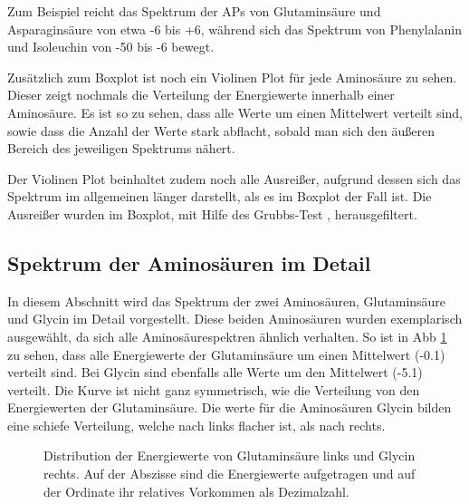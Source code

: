 Zum Beispiel reicht das Spektrum der \ac{APs} von Glutaminsäure und Asparaginsäure von etwa -6 bis +6, während sich das Spektrum von Phenylalanin und Isoleuchin von -50 bis -6 bewegt. 

Zusätzlich zum Boxplot ist noch ein Violinen Plot für jede Aminosäure zu sehen. Dieser zeigt nochmals die Verteilung der Energiewerte innerhalb einer Aminosäure. Es ist so zu sehen, dass alle Werte um einen Mittelwert verteilt sind, sowie dass die Anzahl der Werte stark abflacht, sobald man sich den äußeren Bereich des jeweiligen Spektrums nähert.

Der Violinen Plot beinhaltet zudem noch alle Ausreißer, aufgrund dessen sich das Spektrum im allgemeinen länger darstellt, als es im Boxplot der Fall ist. Die Ausreißer wurden im Boxplot, mit Hilfe des Grubbs-Test \cite{Jain.2010}, herausgefiltert. 


\newpage
\subsection{Spektrum der Aminosäuren im Detail}
In diesem Abschnitt wird das Spektrum der zwei Aminosäuren, Glutaminsäure und Glycin im Detail vorgestellt. Diese beiden Aminosäuren wurden exemplarisch ausgewählt, da sich alle Aminosäurespektren ähnlich verhalten. So ist in \ac{Abb} \ref{fig:ep_as_distr} zu sehen, dass alle Energiewerte der Glutaminsäure um einen Mittelwert (-0.1) verteilt sind. Bei Glycin sind ebenfalls alle Werte um den Mittelwert (-5.1) verteilt. Die Kurve ist nicht ganz symmetrisch, wie die Verteilung von den Energiewerten der Glutaminsäure. Die werte für die Aminosäuren Glycin bilden eine schiefe Verteilung, welche nach links flacher ist, als nach rechts. 

\begin{figure}[H]
    \caption{Distribution der Energiewerte von Glutaminsäure links und Glycin rechts. Auf der Abszisse sind die Energiewerte aufgetragen und auf der Ordinate ihr relatives Vorkommen als Dezimalzahl.} 
    \label{fig:ep_as_distr}
\end{figure}

